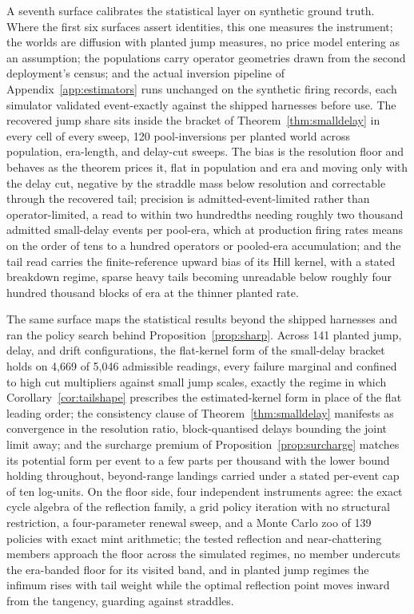 \documentclass[11pt,a4paper]{article}
\theoremstyle{definition}
\theoremstyle{plain}
\theoremstyle{remark}
\begin{document}
A seventh surface calibrates the statistical layer on synthetic ground truth. Where the first six surfaces assert identities, this one measures the instrument; the worlds are diffusion with 
planted jump measures, no price model entering as an assumption; the populations carry operator geometries drawn from the second deployment's census; and the actual inversion pipeline of 
Appendix~\ref{app:estimators} runs unchanged on the synthetic firing records, each simulator validated event-exactly against the shipped harnesses before use. The recovered jump share sits 
inside the bracket of Theorem~\ref{thm:smalldelay} in every cell of every sweep, 120 pool-inversions per planted world across population, era-length, and delay-cut sweeps. The bias is the 
resolution floor and behaves as the theorem prices it, flat in population and era and moving only with the delay cut, negative by the straddle mass below resolution and correctable through 
the recovered tail; precision is admitted-event-limited rather than operator-limited, a read to within two hundredths needing roughly two thousand admitted small-delay events per pool-era, 
which at production firing rates means on the order of tens to a hundred operators or pooled-era accumulation; and the tail read carries the finite-reference upward bias of its Hill kernel, 
with a stated breakdown regime, sparse heavy tails becoming unreadable below roughly four hundred thousand blocks of era at the thinner planted rate.

The same surface maps the statistical results beyond the shipped harnesses and ran the policy search behind Proposition~\ref{prop:sharp}. Across 141 planted jump, delay, and drift configurations, 
the flat-kernel form of the small-delay bracket holds on 4{,}669 of 5{,}046 admissible readings, every failure marginal and confined to high cut multipliers against small jump scales, exactly the 
regime in which Corollary~\ref{cor:tailshape} prescribes the estimated-kernel form in place of the flat leading order; the consistency clause of Theorem~\ref{thm:smalldelay} manifests as convergence 
in the resolution ratio, block-quantised delays bounding the joint limit away; and the surcharge premium of Proposition~\ref{prop:surcharge} matches its potential form per event to a few parts per 
thousand with the lower bound holding throughout, beyond-range landings carried under a stated per-event cap of ten log-units. On the floor side, four independent instruments agree: the exact cycle 
algebra of the reflection family, a grid policy iteration with no structural restriction, a four-parameter renewal sweep, and a Monte Carlo zoo of 139 policies with exact mint arithmetic; the 
tested reflection and near-chattering members approach the floor across the simulated regimes, no member undercuts the era-banded floor for its visited band, and in planted jump regimes the 
infimum rises with tail weight while the optimal reflection point moves inward from the tangency, guarding against straddles.
\end{document}
